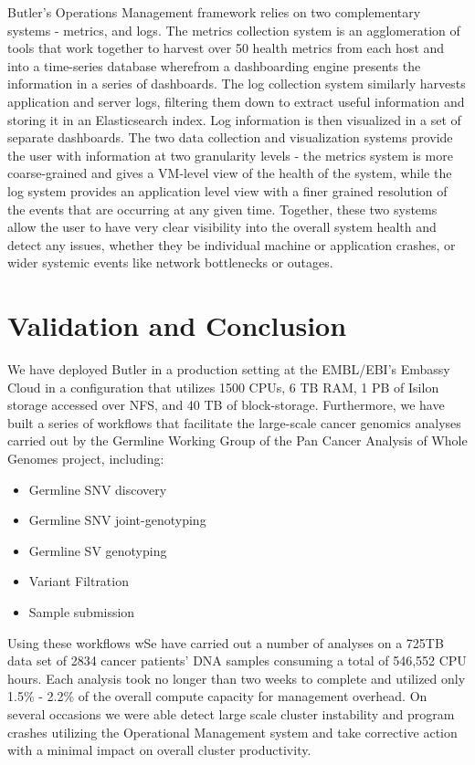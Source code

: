 Butler's Operations Management framework relies on two complementary systems - metrics, and logs. The metrics collection system is an agglomeration of tools that work together to harvest over 50 health metrics from each host and into a time-series database wherefrom a dashboarding engine presents the information in a series of dashboards. The log collection system similarly harvests application and server logs, filtering them down to extract useful information and storing it in an Elasticsearch index. Log information is then visualized in a set of separate dashboards. The two data collection and visualization systems provide the user with information at two granularity levels - the metrics system is more coarse-grained and gives a VM-level view of the health of the system, while the log system provides an application level view with a finer grained resolution of the events that are occurring at any given time. Together, these two systems allow the user to have very clear visibility into the overall system health and detect any issues, whether they be individual machine or application crashes, or wider systemic events like network bottlenecks or outages.

\section{Validation and Conclusion}
We have deployed Butler in a production setting at the EMBL/EBI's Embassy Cloud in a configuration that utilizes 1500 CPUs, 6 TB RAM, 1 PB of Isilon storage accessed over NFS, and 40 TB of block-storage. Furthermore, we have built a series of workflows that facilitate the large-scale cancer genomics analyses carried out by the Germline Working Group of the Pan Cancer Analysis of Whole Genomes project, including:

\begin{itemize}
\item Germline SNV discovery
\item Germline SNV joint-genotyping
\item Germline SV genotyping
\item Variant Filtration
\item Sample submission
\end{itemize}

Using these workflows wSe have carried out a number of analyses on a 725TB data set of 2834 cancer patients' DNA samples consuming a total of 546,552 CPU hours. Each analysis took no longer than two weeks to complete and utilized only 1.5\% - 2.2\% of the overall compute capacity for management overhead. On several occasions we were able detect large scale cluster instability and program crashes utilizing the Operational Management system and take corrective action with a minimal impact on overall cluster productivity.

